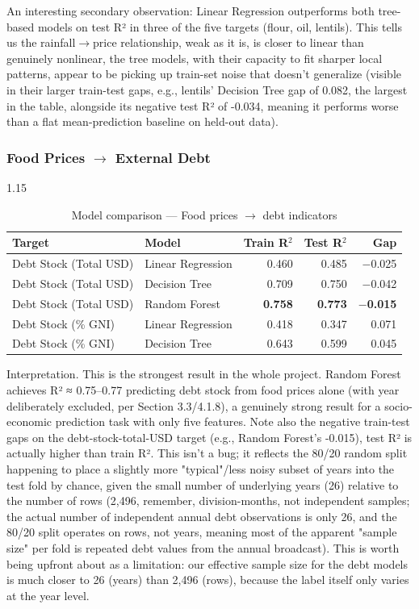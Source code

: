 \documentclass[12pt,a4paper]{article}
\begin{document}
An interesting secondary observation: Linear Regression outperforms both tree-based models on test R² in three of the five targets (flour, oil, lentils). This tells us the rainfall$\rightarrow$price relationship, weak as it is, is closer to linear than genuinely nonlinear, the tree models, with their capacity to fit sharper local patterns, appear to be picking up train-set noise that doesn't generalize (visible in their larger train-test gaps, e.g., lentils' Decision Tree gap of 0.082, the largest in the table, alongside its negative test R² of -0.034, meaning it performs worse than a flat mean-prediction baseline on held-out data).


\subsubsection{Food Prices $\rightarrow$ External Debt}
\begin{table}[H]
\centering
\begin{spacing}{1.15}
\caption{Model comparison --- Food prices $\rightarrow$ debt indicators}
\label{tab:model2}
\begin{tabular}{llrrr}
\toprule
\textbf{Target} & \textbf{Model} & \textbf{Train R$^2$} & \textbf{Test R$^2$} & \textbf{Gap} \\
\midrule
Debt Stock (Total USD) & Linear Regression & 0.460 & 0.485 & $-$0.025 \\
Debt Stock (Total USD) & Decision Tree     & 0.709 & 0.750 & $-$0.042 \\
Debt Stock (Total USD) & Random Forest     & \textbf{0.758} & \textbf{0.773} & \textbf{$-$0.015} \\
\midrule
Debt Stock (\% GNI)    & Linear Regression & 0.418 & 0.347 &  0.071 \\
Debt Stock (\% GNI)    & Decision Tree     & 0.643 & 0.599 &  0.045 \\
\bottomrule
\end{tabular}
\end{spacing}
\end{table}
Interpretation. This is the strongest result in the whole project. Random Forest achieves R² ≈ 0.75--0.77 predicting debt stock from food prices alone (with year deliberately excluded, per Section 3.3/4.1.8), a genuinely strong result for a socio-economic prediction task with only five features. Note also the negative train-test gaps on the debt-stock-total-USD target (e.g., Random Forest's -0.015), test R² is actually higher than train R². This isn't a bug; it reflects the 80/20 random split happening to place a slightly more "typical"/less noisy subset of years into the test fold by chance, given the small number of underlying years (26) relative to the number of rows (2,496, remember, division-months, not independent samples; the actual number of independent annual debt observations is only 26, and the 80/20 split operates on rows, not years, meaning most of the apparent "sample size" per fold is repeated debt values from the annual broadcast). This is worth being upfront about as a limitation: our effective sample size for the debt models is much closer to 26 (years) than 2,496 (rows), because the label itself only varies at the year level.
\end{document}
